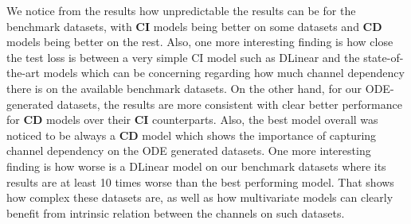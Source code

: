 We notice from the results how unpredictable the results can be for the benchmark datasets, with \textbf{CI} models being better on some datasets and \textbf{CD} models being better on the rest. 
Also, one more interesting finding is how close the test loss is between a very simple CI model such as DLinear and the state-of-the-art models which can be concerning regarding how much channel dependency there is on the available benchmark datasets. 
On the other hand, for our ODE-generated datasets, the results are more consistent with clear better performance for \textbf{CD} models over their \textbf{CI} counterparts.
Also, the best model overall was noticed to be always a \textbf{CD} model which shows the importance of capturing channel dependency on the ODE generated datasets.
One more interesting finding is how worse is a DLinear model on our benchmark datasets where its results are at least 10 times worse than the best performing model.
That shows how complex these datasets are, as well as how multivariate models can clearly benefit from intrinsic relation between the channels on such datasets. 